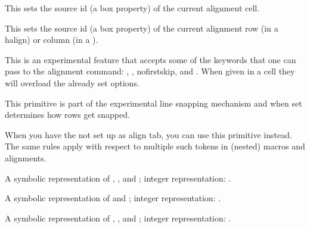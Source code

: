 \stopnewprimitive

\startnewprimitive[title={\prm {alignmentcellsource}}]

This sets the source id (a box property) of the current alignment cell.

\stopnewprimitive

\startnewprimitive[title={\prm {alignmentwrapsource}}]

This sets the source id (a box property) of the current alignment row (in a \prm
{halign}) or column (in a ).

\stopnewprimitive

\startnewprimitive[title={\prm {alignoption}}]

This is an experimental feature that accepts some of the keywords that one can
pass to the alignment command: , , \typ
{nofirstskip},  and . When given in a cell they
will overload the already set options.

\stopnewprimitive

\startnewprimitive[title={\prm {alignsnapping}}]

This primitive is part of the experimental line snapping mechanism and when set
determines how rows get snapped.

\stopnewprimitive

\startnewprimitive[title={\prm {aligntab}}]

When you have the \type {&} not set up as align tab, you can use this primitive
instead. The same rules apply with respect to multiple such tokens in (nested)
macros and alignments.

\stopnewprimitive

\startnewprimitive[title={\prm {allcrampedstyles}}]

A symbolic representation of , ,
 and ; integer
representation: \the\allcrampedstyles.

\stopnewprimitive

\startnewprimitive[title={\prm {alldisplaystyles}}]

A symbolic representation of  and ;
integer representation: \the\alldisplaystyles.

\stopnewprimitive

\startnewprimitive[title={\prm {allmainstyles}}]

A symbolic representation of , ,
 and ; integer representation:
\the\allmainstyles.

